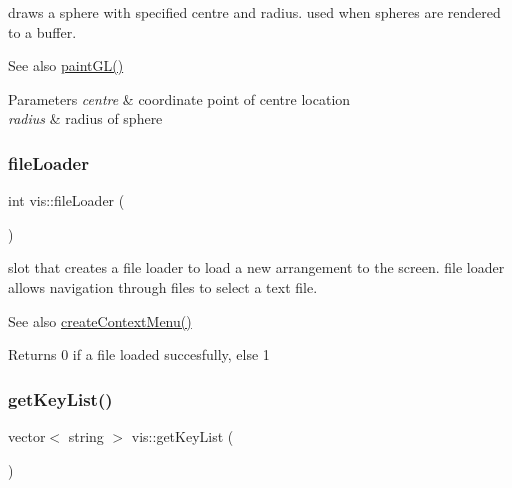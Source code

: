 draws a sphere with specified centre and radius. used when spheres are rendered to a buffer.

\begin{DoxySeeAlso}{See also}
\mbox{\hyperlink{classvis_ace835462bb98cad495e829c08e1a26ea}{paint\+G\+L()}} 
\end{DoxySeeAlso}

\begin{DoxyParams}{Parameters}
{\em centre} & coordinate point of centre location \\
\hline
{\em radius} & radius of sphere \\
\hline
\end{DoxyParams}
\mbox{\label{classvis_a2886cfbc9070b5622347b1c6c87dfe18}} 
\subsubsection{\texorpdfstring{file\+Loader}{fileLoader}}
{\footnotesize\ttfamily int vis\+::file\+Loader (\begin{DoxyParamCaption}{ }\end{DoxyParamCaption})\hspace{0.3cm}{\ttfamily [slot]}}

slot that creates a file loader to load a new arrangement to the screen. file loader allows navigation through files to select a text file.

\begin{DoxySeeAlso}{See also}
\mbox{\hyperlink{classvis_a63af66f730f0f06f36d255bcc7a7a244}{create\+Context\+Menu()}} 
\end{DoxySeeAlso}
\begin{DoxyReturn}{Returns}
0 if a file loaded succesfully, else 1 
\end{DoxyReturn}
\mbox{\label{classvis_a4802cc95e28174087be125f61a31ef60}} 
\subsubsection{\texorpdfstring{get\+Key\+List()}{getKeyList()}}
{\footnotesize\ttfamily vector$<$ string $>$ vis\+::get\+Key\+List (\begin{DoxyParamCaption}{ }\end{DoxyParamCaption})}


